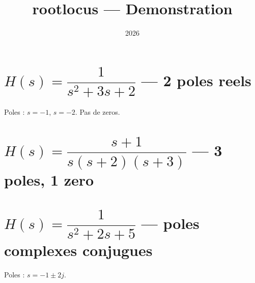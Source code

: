\documentclass[a4paper,11pt]{article}
\title{\textbf{rootlocus} --- Demonstration}
\date{2026}
\begin{document}
\maketitle

\section{$H(s) = \dfrac{1}{s^2+3s+2}$ --- 2 poles reels}

Poles : $s=-1$, $s=-2$. Pas de zeros.

\begin{center}
\end{center}

\section{$H(s) = \dfrac{s+1}{s(s+2)(s+3)}$ --- 3 poles, 1 zero}

\begin{center}
\end{center}

\section{$H(s) = \dfrac{1}{s^2+2s+5}$ --- poles complexes conjugues}

Poles : $s = -1 \pm 2j$.

\begin{center}
\end{center}
\end{document}
